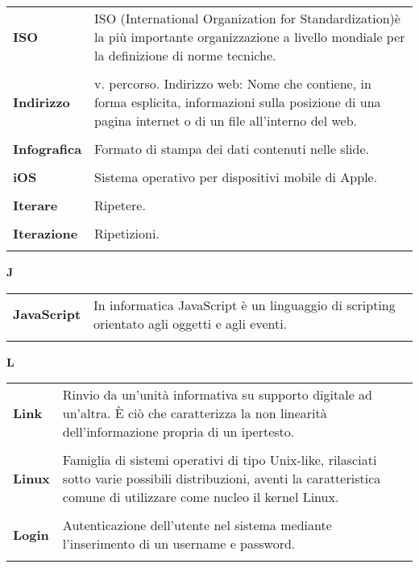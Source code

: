{\begin{longtable}{L{4cm} p{10cm}}
 \\ 
\textbf{ISO} & ISO (International Organization for Standardization)è la più importante organizzazione a livello mondiale per la definizione di norme tecniche. \\ 
 \\ 
\textbf{Indirizzo} & v. percorso. Indirizzo web: Nome che contiene, in forma esplicita, informazioni sulla posizione di una pagina internet o di un file all'interno del web. \\ 
 \\ 
\textbf{Infografica} & Formato di stampa dei dati contenuti nelle slide. \\ 
 \\ 

\textbf{iOS} & Sistema operativo per dispositivi mobile di Apple. \\ 
\\
\textbf{Iterare} & Ripetere. \\ 
 \\ 
\textbf{Iterazione} & Ripetizioni. \\ 
 \\ 
\end{longtable} 
\newpage 
{} 
{} 
\hfill\Huge{\textbf{J}} \\ 
\normalsize 
\begin{longtable}{L{4cm} p{10cm}}
\textbf{JavaScript} & In informatica JavaScript è un linguaggio di scripting orientato agli oggetti e agli eventi. \\ 
 \\ 
\end{longtable} 
\newpage 
{} 
{} 
\hfill\Huge{\textbf{L}} \\ 
\normalsize 
\begin{longtable}{L{4cm} p{10cm}}
\textbf{Link} & Rinvio da un'unità informativa su supporto digitale ad un'altra. È ciò che caratterizza la non linearità dell'informazione propria di un ipertesto. \\ 
 \\ 
\textbf{Linux} & Famiglia di sistemi operativi di tipo Unix-like, rilasciati sotto varie possibili distribuzioni, aventi la caratteristica comune di utilizzare come nucleo il kernel Linux. \\ 
 \\ 
\textbf{Login} & Autenticazione dell’utente nel sistema mediante l’inserimento di un username e password. \\ 
 \\ 

\end{longtable}}
